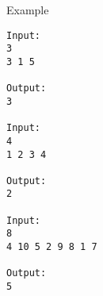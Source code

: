 Example
\begin{verbatim}
Input:
3
3 1 5

Output:
3

Input:
4
1 2 3 4

Output:
2

Input:
8
4 10 5 2 9 8 1 7

Output:
5
\end{verbatim}